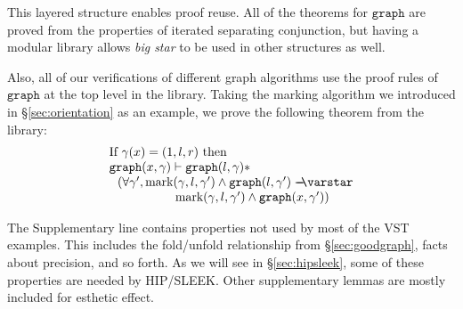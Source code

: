 This layered structure enables proof reuse. All of the theorems for $\mathtt{graph}$ are proved from the properties of iterated separating conjunction, but having a modular library allows \emph{big star} to be used in other structures as well.

Also, all of our verifications of different graph algorithms use the proof rules of $\mathtt{graph}$ at the top level in the library. Taking the marking algorithm we introduced in \S\ref{sec:orientation} as an example, we prove the following theorem from the library:
\begin{equation}
\label{lem:updatesubgraph}
\begin{array}{l}
\text{If } \gamma(x) = (1, l, r) \text{ then } \\
\mathtt{graph}(x, \gamma) \vdash \mathtt{graph}(l, \gamma) * \\
~~ (\forall \gamma', \text{mark}(\gamma, l, \gamma') \wedge \mathtt{graph}(l, \gamma') \wand \\
~~~~~~~~~~~~~~~~ \text{mark}(\gamma, l, \gamma') \wedge \mathtt{graph}(x, \gamma'))
\end{array}
\end{equation}

The Supplementary line contains properties not used by most of the VST examples.  This includes the fold/unfold relationship from \S\ref{sec:goodgraph}, facts about precision, and so forth.  As we will see in \S\ref{sec:hipsleek}, some of these properties are needed by HIP/SLEEK.  Other supplementary lemmas are mostly included for esthetic effect.


%

